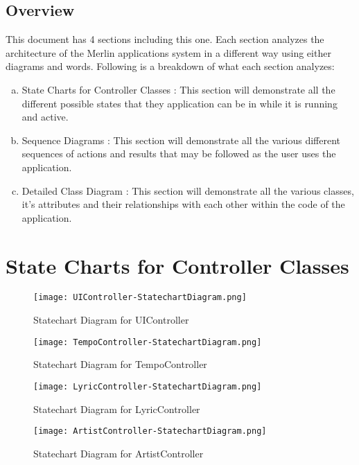 \documentclass[]{article}
\begin{document}
\subsection{Overview}
\label{sub:overview}
This document has 4 sections including this one. Each section analyzes the architecture of the Merlin applications system in a different way using either diagrams and words. Following is a breakdown of what each section analyzes:
\begin{enumerate}[a)]
	\item State Charts for Controller Classes : This section will demonstrate all the different possible states that they application can be in while it is running and active.
	\item Sequence Diagrams : This section will demonstrate all the various different sequences of actions and results that may be followed as the user uses the application.
	\item Detailed Class Diagram : This section will demonstrate all the various classes, it's attributes and their relationships with each other within the code of the application.
\end{enumerate}



\section{State Charts for Controller Classes}
\label{sec:state_charts_for_controller_classes}
\begin{figure}
	\centering
	\texttt{[image: UIController-StatechartDiagram.png]}
	\caption{Statechart Diagram for UIController}
	\label{fig:uicontroller_statechart}
\end{figure}
\begin{figure}
	\centering
	\texttt{[image: TempoController-StatechartDiagram.png]}
	\caption{Statechart Diagram for TempoController}
	\label{fig:uicontroller_statechart}
\end{figure}
\begin{figure}
	\centering
	\texttt{[image: LyricController-StatechartDiagram.png]}
	\caption{Statechart Diagram for LyricController}
	\label{fig:uicontroller_statechart}
\end{figure}
\begin{figure}
	\centering
	\texttt{[image: ArtistController-StatechartDiagram.png]}
	\caption{Statechart Diagram for ArtistController}
	\label{fig:uicontroller_statechart}
\end{figure}
\FloatBarrier
\end{document}
